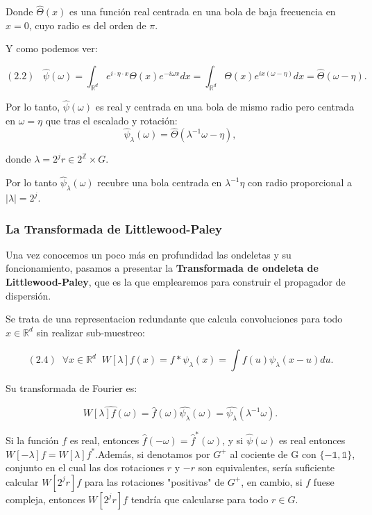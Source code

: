 \noindent Donde $\widehat{\Theta}(x)$ es una función real centrada en una bola de baja frecuencia en $x=0$, cuyo radio es del orden de $\pi$.

\medskip

\noindent Y como podemos ver:

$$(2.2) \;\;\; \widehat{\psi}(\omega)=\int_{\mathbb{R}^d}e^{i\cdot \eta \cdot  x} \Theta(x) e^{-i\omega x} dx=\int_{\mathbb{R}^d}\Theta(x) e^{ix(\omega-\eta)} dx=\widehat{\Theta}(\omega-\eta).$$

\medskip

\noindent Por lo tanto, $\widehat{\psi}(\omega)$ es real y centrada en una bola de mismo radio pero centrada en $\omega=\eta$ que tras el escalado y rotación: 
$$\widehat{\psi}_\lambda(\omega)= \widehat{\Theta} (\lambda^{-1}\omega-\eta),$$ 

\noindent donde $\lambda=2^jr \in 2^{\mathbb{Z}}\times G$. 

\noindent Por lo tanto $\widehat{\psi}_\lambda(\omega)$ recubre una bola centrada en $\lambda^{-1}\eta$ con radio proporcional a $|\lambda|=2^j$.
 
\medskip 

\subsubsection{La Transformada de Littlewood-Paley}

\noindent Una vez conocemos un poco más en profundidad las ondeletas y su foncionamiento, pasamos a presentar la \textbf{Transformada de ondeleta de Littlewood-Paley}, que es la que emplearemos para construir el propagador de dispersión.

\noindent Se trata de una representacion redundante que calcula convoluciones para todo $x \in \mathbb{R}^d$ sin realizar sub-muestreo: 

$$(2.4) \; \; \forall x \in  \mathbb{R}^d \;\; W[\lambda]f(x)= f \ast \psi_\lambda(x)=\int f(u)\psi_\lambda(x-u) du .$$

\noindent Su transformada de Fourier es: 

$$\widehat{W[\lambda]f(\omega)}=\widehat{f}(\omega)\widehat{\psi_\lambda}(\omega)=\widehat{\psi_\lambda}(\lambda^{-1}\omega).$$

\noindent Si la función $f$ es real, entonces $\widehat{f}(-\omega)=\widehat{f}^{\ast}(\omega)$, y si $\widehat{\psi}(\omega)$ es real entonces $W[-\lambda]f=W[\lambda]f^{\ast}$.Además, si denotamos por $G^{+}$ al cociente de G con $\lbrace-\mathbb{1},\mathbb{1}\rbrace$, conjunto en el cual las dos rotaciones $r$ y $-r$ son equivalentes, sería suficiente calcular $W[2^jr]f$ para las rotaciones "positivas" de $G^{+}$, en cambio, si $f$ fuese compleja, entonces $W[2^jr]f$ tendría que calcularse para todo $r \in G$. 

